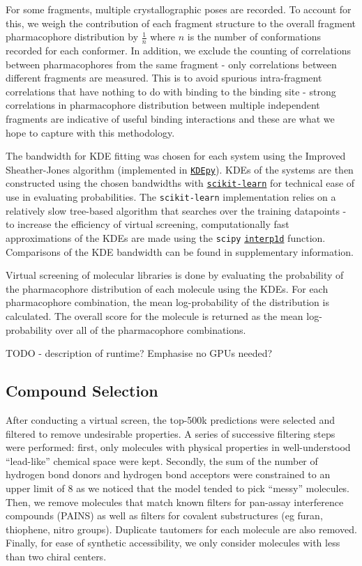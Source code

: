 For some fragments, multiple crystallographic poses are recorded. To account for this, we weigh the contribution of each fragment structure to the overall fragment pharmacophore distribution by $\frac{1}{n}$ where $n$ is the number of conformations recorded for each conformer. In addition, we exclude the counting of correlations between pharmacophores from the same fragment - only correlations between different fragments are measured. This is to avoid spurious intra-fragment correlations that have nothing to do with binding to the binding site - strong correlations in pharmacophore distribution between multiple independent fragments are indicative of useful binding interactions and these are what we hope to capture with this methodology.

The bandwidth for KDE fitting was chosen for each system using the Improved Sheather-Jones algorithm \cite{Botev2010ISJ} (implemented in \href{https://kdepy.readthedocs.io/en/latest/index.html}{\texttt{KDEpy}}). KDEs of the systems are then constructed using the chosen bandwidths with \href{https://scikit-learn.org/stable/}{\texttt{scikit-learn}} for technical ease of use in evaluating probabilities. The \texttt{scikit-learn} implementation relies on a relatively slow tree-based algorithm that searches over the training datapoints - to increase the efficiency of virtual screening, computationally fast approximations of the KDEs are made using the \texttt{scipy} \href{https://docs.scipy.org/doc/scipy/reference/generated/scipy.interpolate.interp1d.html#scipy.interpolate.interp1d}{\texttt{interp1d}} function. Comparisons of the KDE bandwidth can be found in supplementary information.

Virtual screening of molecular libraries is done by evaluating the probability of the pharmacophore distribution of each molecule using the KDEs. For each pharmacophore combination, the mean log-probability of the distribution is calculated. The overall score for the molecule is returned as the mean log-probability over all of the pharmacophore combinations.

TODO - description of runtime? Emphasise no GPUs needed?

\subsection{Compound Selection}
After conducting a virtual screen, the top-500k predictions were selected and filtered to remove undesirable properties. A series of successive filtering steps were performed: first, only molecules with physical properties in well-understood ``lead-like'' chemical space \cite{ChemSpace} were kept. Secondly, the sum of the number of hydrogen bond donors and hydrogen bond acceptors were constrained to an upper limit of 8 as we noticed that the model tended to pick ``messy'' molecules. Then, we remove molecules that match known filters for pan-assay interference compounds (PAINS) \cite{Baell2010Pains} as well as filters for covalent substructures (eg furan, thiophene, nitro groups). Duplicate tautomers for each molecule are also removed. Finally, for ease of synthetic accessibility, we only consider molecules with less than two chiral centers.

